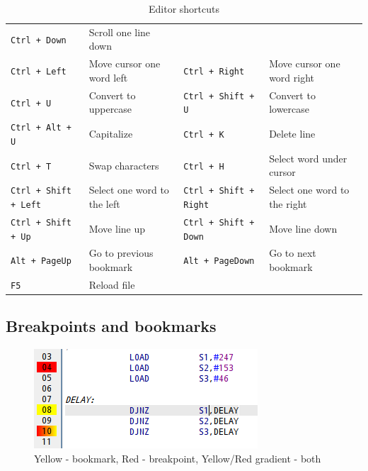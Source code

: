 \begin{table}[h!]
{\begin{tabular}{|ll|ll|}
                        \texttt{Ctrl + Down}                & Scroll one line down          \\
                        \texttt{Ctrl + Left}                & Move cursor one word left     &
                        \texttt{Ctrl + Right}               & Move cursor one word right    \\
                        \texttt{Ctrl + U}                   & Convert to uppercase          &
                        \texttt{Ctrl + Shift + U}           & Convert to lowercase          \\
                        \texttt{Ctrl + Alt + U}             & Capitalize                    &
                        \texttt{Ctrl + K}                   & Delete line                   \\
                        \texttt{Ctrl + T}                   & Swap characters               &
                        \texttt{Ctrl + H}                   & Select word under cursor      \\
                        \texttt{Ctrl + Shift + Left}        & Select one word to the left   &
                        \texttt{Ctrl + Shift + Right}       & Select one word to the right  \\
                        \texttt{Ctrl + Shift + Up}          & Move line up                  &
                        \texttt{Ctrl + Shift + Down}        & Move line down                \\
                        \texttt{Alt + PageUp}               & Go to previous bookmark       &
                        \texttt{Alt + PageDown}             & Go to next bookmark           \\
                        \texttt{F5}                         & Reload file                   &
                                                            &                               \\
                        \hline
                \end{tabular}
            }
            \caption{Editor shortcuts}
        \end{table}

    \clearpage
    \subsection{Breakpoints and bookmarks}
         
        \begin{figure}
            \centering
                \includegraphics[width=.35\textwidth]{img/breakpoints1.png}
                \caption{Yellow - bookmark, Red - breakpoint, Yellow/Red gradient - both}
        \end{figure}

